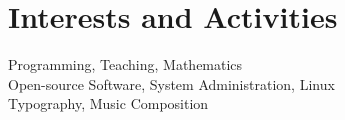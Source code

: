 \documentclass[a4paper,10pt]{article}
\begin{document}
\section{Interests and Activities}
Programming, Teaching, Mathematics\\
Open-source Software, System Administration, Linux\\
Typography, Music Composition



\end{document}
